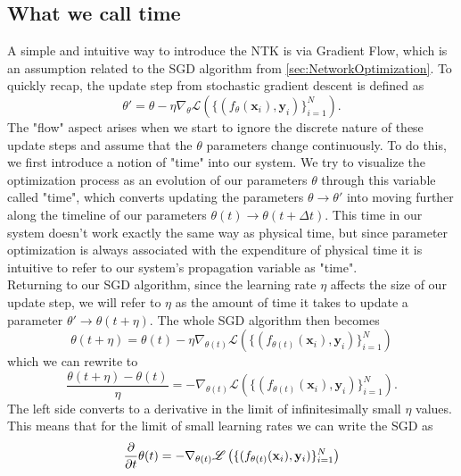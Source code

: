 \subsection{What we call time}
A simple and intuitive way to introduce the NTK is via Gradient Flow, which is an assumption related to the SGD algorithm from \cref{sec:NetworkOptimization}. To quickly recap, the update step from stochastic gradient descent is defined as 
\begin{equation}
	\theta' = \theta - \eta \nabla_\theta \mathscr{L}\left( \{(f_\theta(\mathbf{x}_i), \mathbf{y}_i)\}_{i=1}^{N} \right).
\end{equation}
The "flow" aspect arises when we start to ignore the discrete nature of these update steps and assume that the $\theta$ parameters change continuously. To do this, we first introduce a notion of "time" into our system. We try to visualize the optimization process as an evolution of our parameters $\theta$ through this variable called "time", which converts updating the parameters $\theta \rightarrow \theta'$ into moving further along the timeline of our parameters $\theta(t) \rightarrow \theta(t+\Delta t)$. This time in our system doesn't work exactly the same way as physical time, but since parameter optimization is always associated with the expenditure of physical time it is intuitive to refer to our system's propagation variable as "time". \\
Returning to our SGD algorithm, since the learning rate $\eta$ affects the size of our update step, we will refer to $\eta$ as the amount of time it takes to update a parameter $\theta' \rightarrow \theta(t+\eta)$. The whole SGD algorithm then becomes
\begin{equation}
	\theta(t+\eta) = \theta(t) - \eta \nabla_{\theta(t)} \mathscr{L}\left( \{(f_{\theta(t)}(\mathbf{x}_i), \mathbf{y}_i)\}_{i=1}^{N} \right)
\end{equation}
which we can rewrite to 
\begin{equation}
	\frac{\theta(t+\eta)-\theta(t)}{\eta} = - \nabla_{\theta(t)} \mathscr{L}\left( \{(f_{\theta(t)}(\mathbf{x}_i), \mathbf{y}_i)\}_{i=1}^{N} \right).
\end{equation}
The left side converts to a derivative in the limit of infinitesimally small $\eta$ values. This means that for the limit of small learning rates we can write the SGD as 
\begin{equation}\label{eq:NTKThetaDerivative}
	\frac{\partial}{\partial t}\theta(t) = - \nabla_{\theta(t)} \mathscr{L}\left( \{(f_{\theta(t)}(\mathbf{x}_i), \mathbf{y}_i)\}_{i=1}^{N} \right)
\end{equation}
